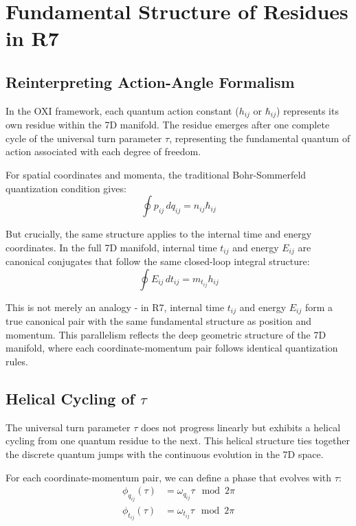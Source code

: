 \documentclass{article}
\begin{document}
\section{Fundamental Structure of Residues in R7}

\subsection{Reinterpreting Action-Angle Formalism}

In the OXI framework, each quantum action constant ($h_{ij}$ or $\hbar_{ij}$) represents its own residue within the 7D manifold. The residue emerges after one complete cycle of the universal turn parameter $\tau$, representing the fundamental quantum of action associated with each degree of freedom.

For spatial coordinates and momenta, the traditional Bohr-Sommerfeld quantization condition gives:
\begin{equation}
\oint p_{ij} \, dq_{ij} = n_{ij} \hbar_{ij}
\end{equation}

But crucially, the same structure applies to the internal time and energy coordinates. In the full 7D manifold, internal time $t_{ij}$ and energy $E_{ij}$ are canonical conjugates that follow the same closed-loop integral structure:
\begin{equation}
\oint E_{ij} \, dt_{ij} = m_{t_{ij}} h_{ij}
\end{equation}

This is not merely an analogy - in R7, internal time $t_{ij}$ and energy $E_{ij}$ form a true canonical pair with the same fundamental structure as position and momentum. This parallelism reflects the deep geometric structure of the 7D manifold, where each coordinate-momentum pair follows identical quantization rules.

\subsection{Helical Cycling of $\tau$}

The universal turn parameter $\tau$ does not progress linearly but exhibits a helical cycling from one quantum residue to the next. This helical structure ties together the discrete quantum jumps with the continuous evolution in the 7D space.

For each coordinate-momentum pair, we can define a phase that evolves with $\tau$:
\begin{align}
\phi_{q_{ij}}(\tau) &= \omega_{q_{ij}} \tau \mod 2\pi \\
\phi_{t_{ij}}(\tau) &= \omega_{t_{ij}} \tau \mod 2\pi
\end{align}
\end{document}
